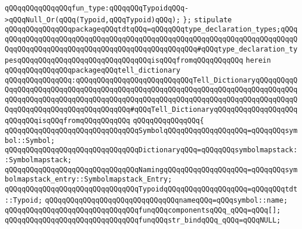 \verb|qQQqqQQqqQQqqQQqfun_type:qQQqqQQqTypoidqQQq->qQQqNull_Or(qQQq(Typoid,qQQqTypoid)qQQq);|\newline
\verb|};|\newline
\newline
\verb|stipulate|\newline
\verb|qQQqqQQqqQQqqQQqpackageqQQqtdtqQQq=qQQqqQQqtype_declaration_types;qQQqqQQqqQQqqQQqqQQqqQQqqQQqqQQqqQQqqQQqqQQqqQQqqQQqqQQqqQQqqQQqqQQqqQQqqQQqqQQqqQQqqQQqqQQqqQQqqQQqqQQqqQQqqQQqqQQqqQQq#qQQqtype_declaration_typesqQQqqQQqqQQqqQQqqQQqqQQqqQQqqQQqisqQQqfromqQQqqQQqqQQq|\newline
\verb|herein|\newline
\newline
\verb|qQQqqQQqqQQqqQQqpackageqQQqtell_dictionary|\newline
\verb|qQQqqQQqqQQqqQQq:qQQqqQQqqQQqqQQqqQQqqQQqqQQqTell_DictionaryqQQqqQQqqQQqqQQqqQQqqQQqqQQqqQQqqQQqqQQqqQQqqQQqqQQqqQQqqQQqqQQqqQQqqQQqqQQqqQQqqQQqqQQqqQQqqQQqqQQqqQQqqQQqqQQqqQQqqQQqqQQqqQQqqQQqqQQqqQQqqQQqqQQqqQQqqQQqqQQqqQQqqQQqqQQqqQQqqQQq#qQQqTell_DictionaryqQQqqQQqqQQqqQQqqQQqqQQqqQQqisqQQqfromqQQqqQQqqQQq|\newline
\verb|qQQqqQQqqQQqqQQq{|\newline
\verb|qQQqqQQqqQQqqQQqqQQqqQQqqQQqqQQqSymbolqQQqqQQqqQQqqQQqqQQq=qQQqqQQqsymbol::Symbol;|\newline
\verb|qQQqqQQqqQQqqQQqqQQqqQQqqQQqqQQqDictionaryqQQq=qQQqqQQqsymbolmapstack::Symbolmapstack;|\newline
\verb|qQQqqQQqqQQqqQQqqQQqqQQqqQQqqQQqNamingqQQqqQQqqQQqqQQqqQQq=qQQqqQQqsymbolmapstack_entry::Symbolmapstack_Entry;|\newline
\verb|qQQqqQQqqQQqqQQqqQQqqQQqqQQqqQQqTypoidqQQqqQQqqQQqqQQqqQQq=qQQqqQQqtdt::Typoid;|\newline
\newline
\verb|qQQqqQQqqQQqqQQqqQQqqQQqqQQqqQQqnameqQQq=qQQqsymbol::name;|\newline
\newline
\verb|qQQqqQQqqQQqqQQqqQQqqQQqqQQqqQQqfunqQQqcomponentsqQQq_qQQq=qQQq[];|\newline
\verb|qQQqqQQqqQQqqQQqqQQqqQQqqQQqqQQqfunqQQqstr_bindqQQq_qQQq=qQQqNULL;|\newline
